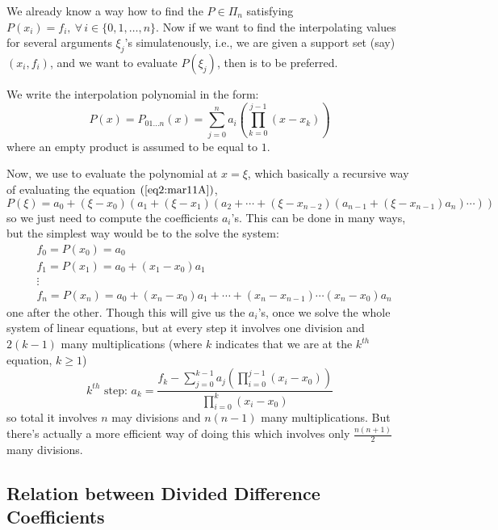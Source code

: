 We already know a way how to find the $P \in \Pi_n$ satisfying $P(x_i) = f_i, \ \forall \, i \in \{0,1,\dots,n\}$. Now
if we want to find the interpolating values for several arguments $\xi_j$'s simulatenously, i.e., we are given a support set (say) $(x_i,f_i)$, and we want to evaluate $P(\xi_j)$, then  is to be preferred.

We write the interpolation polynomial in the form:
\begin{equation}\label{eq2:mar11A}
    P(x) = P_{01\dots n}(x) = \sum_{j=0}^n a_i \left(\prod_{k=0}^{j-1} (x-x_k)\right)
\end{equation}
where an empty product is assumed to be equal to $1$. 

Now, we use  to evaluate the polynomial at $x = \xi$, which basically a recursive way of evaluating the equation $(\ref{eq2:mar11A})$,
\begin{equation}\label{eq3:mar11A}
    P(\xi) = a_0 + (\xi - x_0)\left( a_1 + (\xi - x_1)\left(  a_2 + \cdots + (\xi - x_{n-2})\left( a_{n-1} + (\xi - x_{n-1})a_n \right) \cdots \right) \right)
\end{equation}
so we just need to compute the coefficients $a_i$'s. This can be done in many ways, but the simplest way would be to the solve the system:
\begin{align*}
    &f_0 = P(x_0) = a_0 \\ 
    &f_1 = P(x_1) = a_0 + (x_1 - x_0)a_1 \\ 
    &\vdots \\
    &f_n = P(x_n) = a_0 + (x_n - x_0)a_1 +\cdots+ (x_n-x_{n-1})\cdots(x_n - x_0)a_n
\end{align*}
one after the other. Though this will give us the $a_i$'s, once we solve the whole system of linear equations, but at every step it involves one division and $2(k-1)$ many multiplications (where $k$ indicates that we are at the $k^{th}$ equation, $k \geq 1$)
\[
  k^{th}\mbox{ step: } a_k = \frac{f_k - \sum_{j=0}^{k-1}a_j \left(\prod_{i=0}^{j-1}(x_i-x_0)\right)}{\prod_{i=0}^k (x_i - x_0)}
\]
so total it involves $n$ may divisions and $n(n-1)$ many multiplications. But there's actually a more efficient way of doing this which involves only $\frac{n(n+1)}{2}$ many divisions.

\subsection{Relation between Divided Difference Coefficients}

